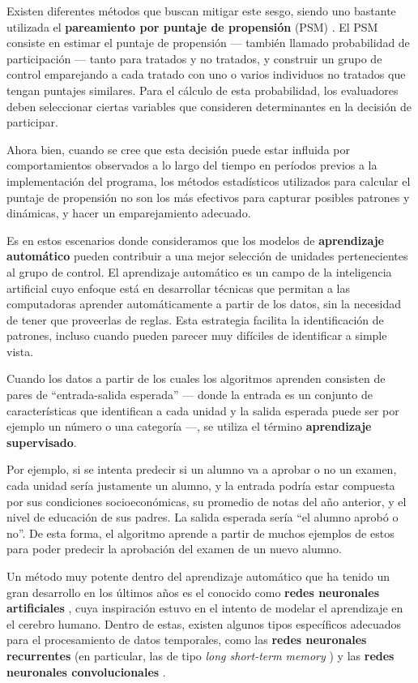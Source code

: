 \documentclass[../main.tex]{subfiles}
\begin{document}
Existen diferentes métodos que buscan mitigar este sesgo, siendo uno bastante utilizada el
\textbf{pareamiento por puntaje de propensión} (PSM)
\cite{psm1983}\cite{a-primer-for-applying-psm}. El PSM consiste en estimar el puntaje de
propensión — también llamado probabilidad de participación — tanto para tratados y no
tratados, y construir un grupo de control emparejando a cada tratado con uno o varios
individuos no tratados que tengan puntajes similares. Para el cálculo de esta
probabilidad, los evaluadores deben seleccionar ciertas variables que consideren
determinantes en la decisión de participar.

Ahora bien, cuando se cree que esta decisión puede estar influida por comportamientos
observados a lo largo del tiempo en períodos previos a la implementación del programa, los
métodos estadísticos utilizados para calcular el puntaje de propensión no son los más
efectivos para capturar posibles patrones y dinámicas, y hacer un emparejamiento adecuado.

Es en estos escenarios donde consideramos que los modelos de \textbf{aprendizaje
automático} \cite{deep-learning}\cite{ai-a-modern-approach} pueden contribuir a una mejor
selección de unidades pertenecientes al grupo de control. El aprendizaje automático es un
campo de la inteligencia artificial cuyo enfoque está en desarrollar técnicas que permitan
a las computadoras aprender automáticamente a partir de los datos, sin la necesidad de
tener que proveerlas de reglas. Esta estrategia facilita la identificación de patrones,
incluso cuando pueden parecer muy difíciles de identificar a simple vista.

Cuando los datos a partir de los cuales los algoritmos aprenden consisten de pares de
``entrada-salida esperada'' — donde la entrada es un conjunto de características que
identifican a cada unidad y la salida esperada puede ser por ejemplo un número o una
categoría —, se utiliza el término \textbf{aprendizaje supervisado}.

Por ejemplo, si se intenta predecir si un alumno va a aprobar o no un examen, cada unidad
sería justamente un alumno, y la entrada podría estar compuesta por sus condiciones
socioeconómicas, su promedio de notas del año anterior, y el nivel de educación de sus
padres. La salida esperada sería ``el alumno aprobó o no''. De esta forma, el algoritmo
aprende a partir de muchos ejemplos de estos para poder predecir la aprobación del examen
de un nuevo alumno.

Un método muy potente dentro del aprendizaje automático que ha tenido un gran desarrollo
en los últimos años es el conocido como \textbf{redes neuronales artificiales}
\cite{nielsen}, cuya inspiración estuvo en el intento de modelar el aprendizaje en el
cerebro humano. Dentro de estas, existen algunos tipos específicos adecuados para el
procesamiento de datos temporales, como las \textbf{redes neuronales recurrentes} (en
particular, las de tipo \textit{long short-term memory}\cite{lstm-paper-1997} ) y las
\textbf{redes neuronales convolucionales} \cite{prince2024understanding}.
\end{document}
